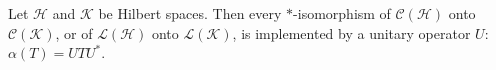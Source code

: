Let $\mathcal{H}$ and $\mathcal{K}$ be Hilbert spaces. Then every $\ast$-isomorphism of $\mathcal{C}(\mathcal{H})$ onto $\mathcal{C}(\mathcal{K})$, or of $\mathcal{L}(\mathcal{H})$ onto $\mathcal{L}(\mathcal{K})$, is implemented by a unitary operator $U$: $\alpha(T) = UTU^*$.
